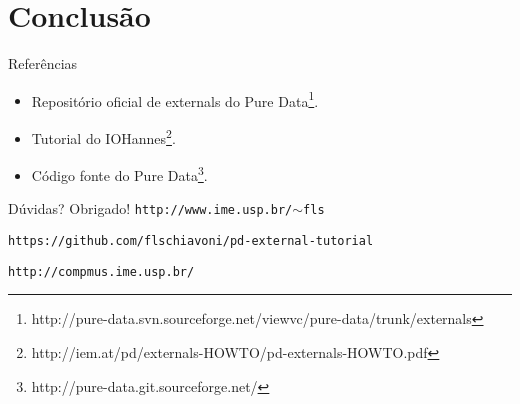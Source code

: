 \section{Conclusão}

\begin{frame}{Referências}
\begin{itemize}
\item Repositório oficial de externals do Pure Data\footnote{http://pure-data.svn.sourceforge.net/viewvc/pure-data/trunk/externals}.
\item Tutorial do IOHannes\footnote{http://iem.at/pd/externals-HOWTO/pd-externals-HOWTO.pdf}.
\item Código fonte do Pure Data\footnote{http://pure-data.git.sourceforge.net/}.
\end{itemize}
\end{frame}


\begin{frame}{Dúvidas?}
{Obrigado!}
\texttt{http://www.ime.usp.br/$\sim$fls}

\texttt{https://github.com/flschiavoni/pd-external-tutorial}

\texttt{http://compmus.ime.usp.br/}
\end{frame}
